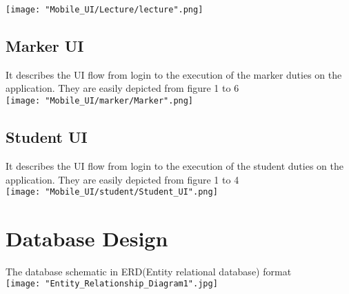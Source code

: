 \documentclass[10pt,a4paper]{article}
\begin{document}
\texttt{[image: "Mobile\_UI/Lecture/lecture".png]}
\subsection*{Marker UI}

It describes the UI flow from login to the execution of the marker duties on the application. They are easily depicted from figure 1 to 6\\

\texttt{[image: "Mobile\_UI/marker/Marker".png]}
\subsection*{Student UI}
It describes the UI flow from login to the execution of the student duties on the application. They are easily depicted from figure 1 to 4\\
\texttt{[image: "Mobile\_UI/student/Student\_UI".png]}

\section{Database Design}
The database schematic in ERD(Entity relational database) format\\
\texttt{[image: "Entity\_Relationship\_Diagram1".jpg]}
\end{document}
